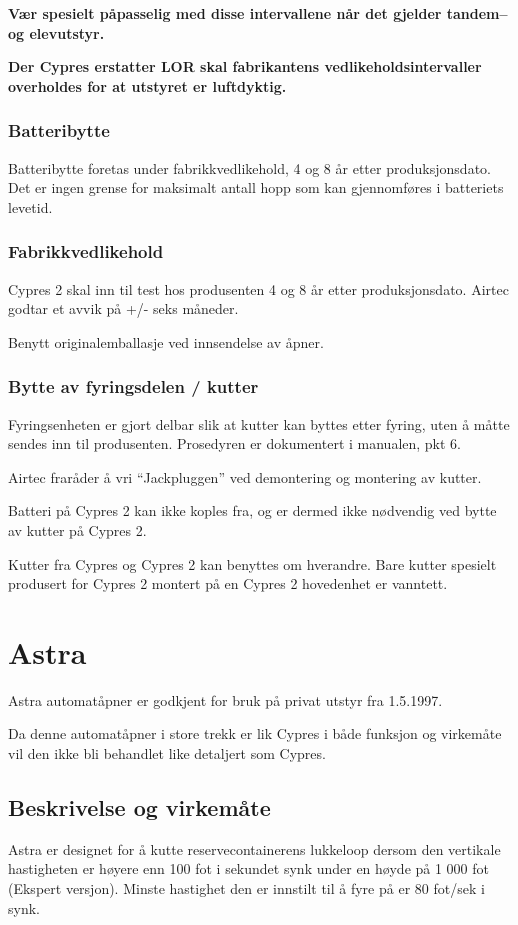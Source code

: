 \textbf{Vær spesielt påpasselig med disse intervallene når det gjelder tandem– og elevutstyr.}

\textbf{Der Cypres erstatter LOR skal fabrikantens vedlikeholdsintervaller overholdes for at utstyret er luftdyktig.}

\subsubsection{Batteribytte}
Batteribytte foretas under fabrikkvedlikehold, 4 og 8 år etter produksjonsdato. Det er ingen grense for maksimalt antall hopp som kan gjennomføres i batteriets levetid.

\subsubsection{Fabrikkvedlikehold}
Cypres 2 skal inn til test hos produsenten 4 og 8 år etter produksjonsdato. Airtec godtar et avvik på +/- seks måneder.

Benytt originalemballasje ved innsendelse av åpner.

\subsubsection{Bytte av fyringsdelen / kutter}
Fyringsenheten er gjort delbar slik at kutter kan byttes etter fyring, uten å måtte sendes inn til produsenten. Prosedyren er dokumentert i manualen, pkt 6.

Airtec fraråder å vri ``Jackpluggen'' ved demontering og montering av kutter.

Batteri på Cypres 2 kan ikke koples fra, og er dermed ikke nødvendig ved bytte av kutter på Cypres 2.

Kutter fra Cypres og Cypres 2 kan benyttes om hverandre. Bare kutter spesielt produsert for Cypres 2 montert på en Cypres 2 hovedenhet er vanntett.

\section{Astra}
Astra automatåpner er godkjent for bruk på privat utstyr fra 1.5.1997.

Da denne automatåpner i store trekk er lik Cypres i både funksjon og virkemåte vil den ikke bli behandlet like detaljert som Cypres.

\subsection{Beskrivelse og virkemåte}
Astra er designet for å kutte reservecontainerens lukkeloop dersom den vertikale hastigheten er høyere enn 100 fot i sekundet synk under en høyde på 1 000 fot (Ekspert versjon). Minste hastighet den er innstilt til å fyre på er 80 fot/sek i synk.

